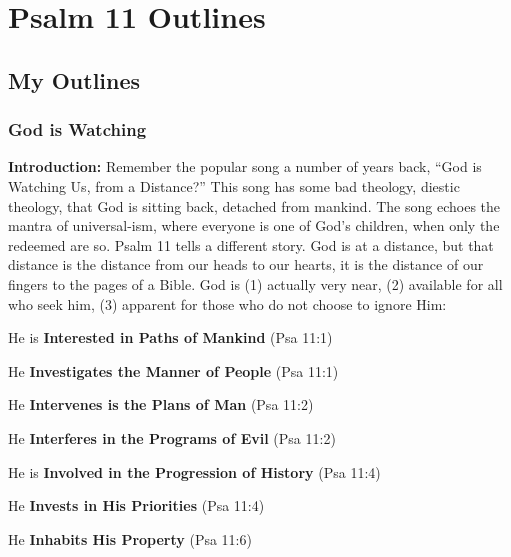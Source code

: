\section{Psalm 11 Outlines}

\subsection{My Outlines}

\subsubsection{God is Watching}
\textbf{Introduction: }Remember the popular song a number of years back, ``God is Watching Us, from a Distance?'' This song has some bad theology, diestic theology, that God is sitting back, detached from mankind. The song echoes the mantra of universal-ism, where everyone is one of God's children, when only the redeemed are so. Psalm 11 tells a different story. God is at a distance, but that distance is the distance from our heads to our hearts, it is the distance of our fingers to the pages of a Bible.  God is (1) actually very near, (2) available for all who seek him, (3) apparent for those who do not choose to ignore Him:%
\begin{compactenum}[I.]
    \item He is \textbf{Interested in Paths of Mankind} (Psa 11:1)
    \item He \textbf{Investigates the Manner of People} (Psa 11:1)
    \item He \textbf{Intervenes is the Plans of Man} (Psa 11:2)
    \item He \textbf{Interferes in the Programs of Evil} (Psa 11:2)
    \item He is \textbf{Involved in the Progression of History} (Psa 11:4)
    \item He \textbf{Invests in His Priorities}  (Psa 11:4)
    \item He \textbf{Inhabits His Property} (Psa 11:6)
\end{compactenum}

